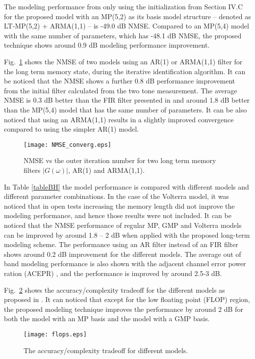 \documentclass[journal]{IEEEtran}
\begin{document}
The modeling performance from only using the initialization from Section IV.C for the proposed model with an MP(5,2) as its basis model structure -- denoted as LT-MP(5,2) + ARMA(1,1) -- is -49.0 dB NMSE. Compared to an MP(5,4) model with the same number of parameters, which has -48.1 dB NMSE, the proposed technique shows around 0.9 dB modeling performance improvement.

Fig.~\ref{NMSE_converge} shows the NMSE of two models using an AR(1) or ARMA(1,1) filter for the long term memory state, during the iterative identification algorithm. It can be noticed that the NMSE shows a further 0.8 dB performance improvement from the initial filter calculated from the two tone measurement. The average NMSE is 0.3 dB better than the FIR filter presented in \cite{soltani2012} and around 1.8 dB better than the MP(5,4) model that has the same number of parameters. It can be also noticed that using an ARMA(1,1) results in a slightly improved convergence compared to using the simpler AR(1) model.
\begin{figure}
\centering
\texttt{[image: NMSE\_converg.eps]}
\caption{NMSE vs the outer iteration number for two long term memory filters $|G(\omega)|$, AR(1) and ARMA(1,1).} \label{NMSE_converge}
\end{figure}

In Table \ref{tableBH} the model performance is compared with different models and different parameter combinations. In the case of the Volterra model, it was noticed that in open tests increasing the memory length did not improve the modeling performance, and hence those results were not included. It can be noticed that the NMSE performance of regular MP, GMP and Volterra models can be improved by around 1.8 -- 2 dB when applied with the proposed long-term modeling scheme. The performance using an AR filter instead of an FIR filter shows around 0.2 dB improvement for the different models. The average out of band modeling performance is also shown with the adjacent channel error power ration (ACEPR) \cite{soltani}, and the performance is improved by around 2.5-3 dB.

Fig.~\ref{flops} shows the accuracy/complexity tradeoff for the different models as proposed in \cite{soltani}. It can noticed that except for the low floating point (FLOP) region, the proposed modeling technique improves the performance by around 2 dB for both the model with an MP basis and the model with a GMP basis.
\begin{figure}
\centering
\texttt{[image: flops.eps]}
\caption{The accuracy/complexity tradeoff for different models.} \label{flops}
\end{figure}
\end{document}
